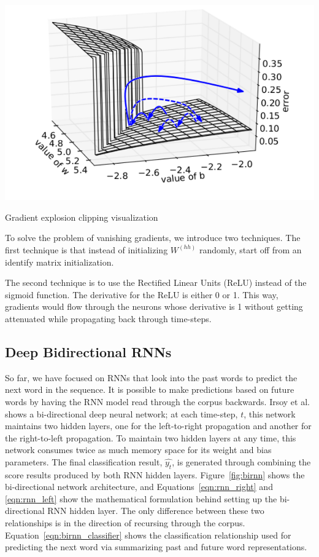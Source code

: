 \documentclass{tufte-handout}
\begin{document}
\begin{marginfigure}
	\centering
	\includegraphics[width=\linewidth]{cliping.pdf}
	\caption {Gradient explosion clipping visualization}
	\label{fig:clipping}
\end{marginfigure}

To solve the problem of vanishing gradients, we introduce two techniques. The first technique is that instead of initializing $W^{(hh)}$ randomly, start off from an identify matrix initialization. 

The second technique is to use the Rectified Linear Units (ReLU) instead of the sigmoid function. The derivative for the ReLU is either 0 or 1. This way, gradients would flow through the neurons whose derivative is 1 without getting attenuated while propagating back through time-steps.


\subsection{Deep Bidirectional RNNs}
So far, we have focused on RNNs that look into the past words to predict the next word in the sequence. It is possible to make predictions based on future words by having the RNN model read through the corpus backwards. Irsoy et al. shows a bi-directional deep neural network; at each time-step, $t$, this network maintains two hidden layers, one for the left-to-right propagation and another for the right-to-left propagation. To maintain two hidden layers at any time, this network consumes twice as much memory space for its weight and bias parameters. The final classification result, $\hat{y_t}$, is generated through combining the score results produced by both RNN hidden layers. Figure~\ref{fig:birnn} shows the bi-directional network architecture, and Equations~\ref{eqn:rnn_right} and \ref{eqn:rnn_left} show the mathematical formulation behind setting up the bi-directional RNN hidden layer. The only difference between these two relationships is in the direction of recursing through the corpus. Equation~\ref{eqn:birnn_classifier} shows the classification relationship used for predicting the next word via summarizing past and future word representations.
\end{document}
